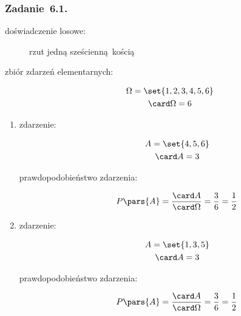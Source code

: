 \subsubsection*{Zadanie~6.1.}
\begin{description}
    \item[doświadczenie losowe:] rzut jedną sześcienną kością
    \item[zbiór zdarzeń elementarnych:]
        \begin{gather*}
            \Omega = \set{1, 2, 3, 4, 5, 6}\\
            \card\Omega = 6
        \end{gather*}
\end{description}
\begin{enumerate}[label={\alph*)}]
    \item
        \begin{description}
            \item[zdarzenie:]
                \begin{gather*}
                    A = \set{4, 5, 6}\\
                    \card A = 3
                \end{gather*}
            \item[prawdopodobieństwo zdarzenia:]
                \begin{equation*}
                    P\pars{A}
                        = \frac{\card A}{\card\Omega}
                        = \frac{3}{6}
                        = \frac{1}{2}
                \end{equation*}
        \end{description}
    \item
        \begin{description}
            \item[zdarzenie:]
                \begin{gather*}
                    A = \set{1, 3, 5}\\
                    \card A = 3
                \end{gather*}
            \item[prawdopodobieństwo zdarzenia:]
                \begin{gather*}
                    P\pars{A}
                        = \frac{\card A}{\card\Omega}
                        = \frac{3}{6}
                        = \frac{1}{2}
                \end{gather*}
        \end{description}
\end{enumerate}
